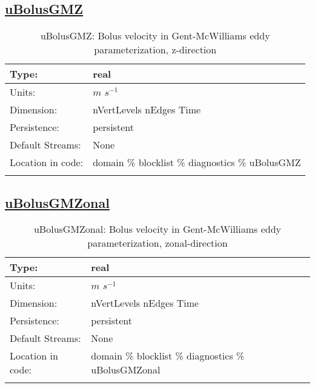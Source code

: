 \subsection[uBolusGMZ]{\hyperref[sec:var_tab_diagnostics]{uBolusGMZ}}
\label{subsec:var_sec_diagnostics_uBolusGMZ}
\begin{center}
\begin{longtable}{| p{2.0in} | p{4.0in} |}
        \hline 
        Type: & real \\
        \hline 
        Units: & $m$ $s^{-1}$ \\
        \hline 
        Dimension: & nVertLevels nEdges Time \\
        \hline 
        Persistence: & persistent \\
        \hline 
		 Default Streams: & None \\
        \hline 
		 Location in code: & domain \% blocklist \% diagnostics \% uBolusGMZ \\
		 \hline 
    \caption{uBolusGMZ: Bolus velocity in Gent-McWilliams eddy parameterization, z-direction}
\end{longtable}
\end{center}
\subsection[uBolusGMZonal]{\hyperref[sec:var_tab_diagnostics]{uBolusGMZonal}}
\label{subsec:var_sec_diagnostics_uBolusGMZonal}
\begin{center}
\begin{longtable}{| p{2.0in} | p{4.0in} |}
        \hline 
        Type: & real \\
        \hline 
        Units: & $m$ $s^{-1}$ \\
        \hline 
        Dimension: & nVertLevels nEdges Time \\
        \hline 
        Persistence: & persistent \\
        \hline 
		 Default Streams: & None \\
        \hline 
		 Location in code: & domain \% blocklist \% diagnostics \% uBolusGMZonal \\
		 \hline 
    \caption{uBolusGMZonal: Bolus velocity in Gent-McWilliams eddy parameterization, zonal-direction}
\end{longtable}
\end{center}
